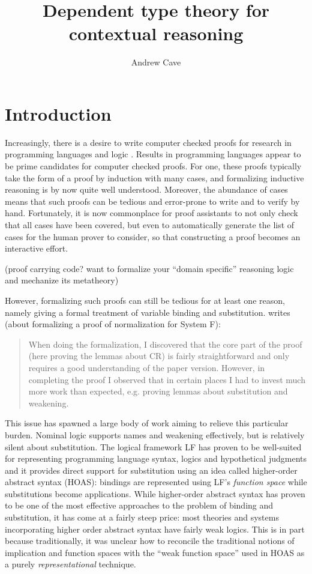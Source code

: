 \documentclass{article}
\author{Andrew Cave}
\title{Dependent type theory for contextual reasoning}
\newcommand{\LONGVERSION}[1]{{\color{light-gray}#1}}
\begin{document}
\maketitle

\section{Introduction}


Increasingly, there is a desire to write computer checked proofs for
research in programming languages and logic
\citep{POPLMark}. Results in programming languages appear to be prime
candidates for computer checked proofs. For one, these proofs typically take the
form of a proof by induction with many cases, and formalizing inductive
reasoning is by now quite well understood. Moreover, the abundance of cases means that such proofs can be
tedious and error-prone to write and to verify by hand. Fortunately, it is now commonplace for proof
assistants to not only check that all cases have been covered, but
even to automatically generate the list of cases for the human prover
to consider, so that constructing a proof becomes an interactive
effort.

\LONGVERSION{(proof carrying code? want to formalize your ``domain specific'' reasoning logic and mechanize
its metatheory)}

However, formalizing such proofs can still be tedious for at least one reason,
namely giving a formal treatment of variable binding and
substitution. \cite{Altenkirch93} writes (about
formalizing a proof of normalization for System F):

\begin{quote}
When doing the formalization, I discovered that the core part of the
proof (here proving the lemmas about CR) is fairly straightforward and
only requires a good understanding of the paper version. However, in
completing the proof I observed that in certain places I had to invest
much more work than expected, e.g. proving lemmas about substitution
and weakening.
\end{quote}

This issue has spawned a large body of work aiming to relieve this
particular burden. Nominal logic \cite{?} supports names and weakening
effectively, but is relatively silent about substitution. The
logical framework LF \citep{Harper93jacm} has proven to be well-suited
for representing programming language syntax, logics and hypothetical
judgments and it provides direct support for substitution using an
idea called higher-order abstract syntax (HOAS): bindings are
represented using LF's \emph{function space} while substitutions become applications. While higher-order
abstract syntax has proven to be one of the most 
effective approaches to the problem of binding and substitution, it
has come at a fairly steep price: most theories and systems
incorporating higher order abstract syntax have fairly weak
logics. This is in part because traditionally, it was unclear how to
reconcile the traditional notions of implication and function spaces with
the ``weak function space'' used in HOAS as a purely \emph{representational} technique.
\end{document}
